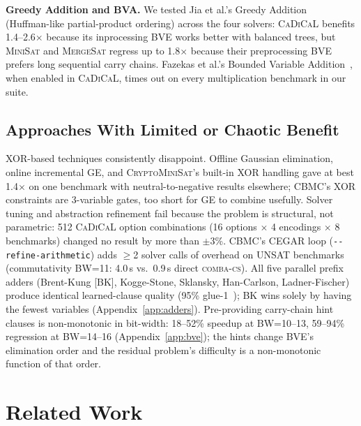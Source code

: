 \documentclass[a4paper]{ceurart}
\newcommand{\combacs}{\textsc{comba-cs}\xspace}
\newcommand{\cadical}{\textsc{CaDiCaL}\xspace}
\newcommand{\minisat}{\textsc{MiniSat}\xspace}
\newcommand{\mergesat}{\textsc{MergeSat}\xspace}
\newcommand{\cryptominisat}{\textsc{CryptoMiniSat}\xspace}
\newcommand{\cbmc}{\textsc{CBMC}\xspace}
\begin{document}
\textbf{Greedy Addition and BVA.} We tested Jia et al.'s Greedy
Addition~\cite{jia2023improving} (Huffman-like partial-product
ordering) across the four solvers: \cadical benefits 1.4--2.6$\times$
because its inprocessing BVE works better with balanced trees, but
\minisat and \mergesat regress up to 1.8$\times$ because their
preprocessing BVE prefers long sequential carry chains. Fazekas et
al.'s Bounded Variable Addition~\cite{fazekas2025incremental},
when enabled in \cadical, times out on every multiplication
benchmark in our suite.

\subsection{Approaches With Limited or Chaotic Benefit}

XOR-based techniques consistently disappoint. Offline Gaussian
elimination, online incremental GE, and \cryptominisat's
built-in XOR handling gave at best 1.4$\times$ on one benchmark
with neutral-to-negative results elsewhere; \cbmc's XOR
constraints are 3-variable gates, too short for GE to combine
usefully. Solver tuning and abstraction refinement fail because
the problem is structural, not parametric: 512 \cadical option
combinations (16 options $\times$ 4 encodings $\times$ 8
benchmarks) changed no result by more than $\pm$3\%. \cbmc's
CEGAR loop (\texttt{-{}-refine-arithmetic}) adds $\geq$2 solver
calls of overhead on UNSAT benchmarks (commutativity BW=11:
4.0\,s vs.\ 0.9\,s direct \combacs).
All five parallel prefix adders (Brent-Kung [BK], Kogge-Stone,
Sklansky, Han-Carlson, Ladner-Fischer) produce identical
learned-clause quality (95\% glue-1~\cite{audemard2009predicting});
BK wins solely by having the fewest variables
(Appendix~\ref{app:adders}).
Pre-providing carry-chain hint clauses is non-monotonic in
bit-width: 18--52\% speedup at BW=10--13, 59--94\% regression at
BW=14--16 (Appendix~\ref{app:bve}); the hints change BVE's
elimination order and the residual problem's difficulty is a
non-monotonic function of that order.

\section{Related Work}
\end{document}
